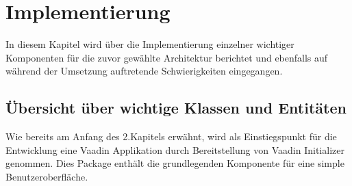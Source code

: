 \documentclass[a4paper,12pt]{scrreprt}
\begin{document}
	
\chapter{Implementierung}
In diesem Kapitel wird über die Implementierung einzelner wichtiger Komponenten für die zuvor gewählte Architektur berichtet und ebenfalls auf während der Umsetzung auftretende Schwierigkeiten eingegangen. 
\section{Übersicht über wichtige Klassen und Entitäten}
Wie bereits am Anfang des 2.Kapitels erwähnt, wird als Einstiegspunkt für die Entwicklung eine Vaadin Applikation durch Bereitstellung von Vaadin Initializer genommen. Dies Package enthält die grundlegenden Komponente für eine simple Benutzeroberfläche. 
	
\end{document}

